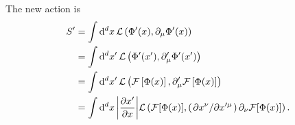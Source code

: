 \documentclass[10pt]{article}
\begin{document}
The new action is
\begin{align}
    S' & =\int\dd[d]{x}\mathcal{L}\left(\Phi'(x),\partial_\mu\Phi'(x)\right)\notag                                                                                               \\
       & =\int\dd[d]{x'}\mathcal{L}\left(\Phi'(x'),\partial'_\mu\Phi'(x')\right)\notag                                                                                           \\
       & =\int\dd[d]{x'}\mathcal{L}\left(\mathcal{F}\left[\Phi(x)\right],\partial'_\mu\mathcal{F}\left[\Phi(x)\right]\right)\notag                                               \\
       & =\int\dd[d]{x}\abs{\pdv{x'}{x}}\mathcal{L}\left(\mathcal{F}[\Phi(x)],\left(\pdv*{x^\nu}{x'^\mu}\right)\partial_\nu\mathcal{F}[\Phi(x)]\right).\label{eq:CST:new_action}
\end{align}
\end{document}

